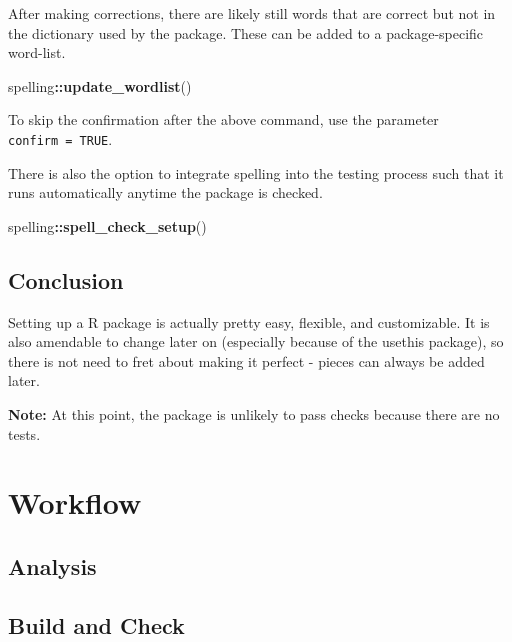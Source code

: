\documentclass[]{book}
\newenvironment{Shaded}{\begin{snugshade}}{\end{snugshade}}
\newcommand{\KeywordTok}[1]{\textcolor[rgb]{0.13,0.29,0.53}{\textbf{#1}}}
\newcommand{\NormalTok}[1]{#1}
\newcommand{\OperatorTok}[1]{\textcolor[rgb]{0.81,0.36,0.00}{\textbf{#1}}}
\begin{document}
After making corrections, there are likely still words that are correct but not in the dictionary used by the package. These can be added to a package-specific word-list.

\begin{Shaded}
\begin{Highlighting}[]
\NormalTok{spelling}\OperatorTok{::}\KeywordTok{update_wordlist}\NormalTok{()}
\end{Highlighting}
\end{Shaded}

To skip the confirmation after the above command, use the parameter \texttt{confirm\ =\ TRUE}.

There is also the option to integrate spelling into the testing process such that it runs automatically anytime the package is checked.

\begin{Shaded}
\begin{Highlighting}[]
\NormalTok{spelling}\OperatorTok{::}\KeywordTok{spell_check_setup}\NormalTok{()}
\end{Highlighting}
\end{Shaded}

\hypertarget{conclusion}{%
\section{Conclusion}\label{conclusion}}

Setting up a R package is actually pretty easy, flexible, and customizable. It is also amendable to change later on (especially because of the usethis package), so there is not need to fret about making it perfect - pieces can always be added later.

\textbf{Note:} At this point, the package is unlikely to pass checks because there are no tests.

\hypertarget{workflow}{%
\chapter{Workflow}\label{workflow}}

\hypertarget{analysis}{%
\section{Analysis}\label{analysis}}

\hypertarget{build-and-check}{%
\section{Build and Check}\label{build-and-check}}
\end{document}
